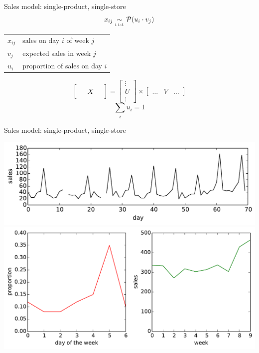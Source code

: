 \documentclass{beamer}
\begin{document}
\begin{frame}{Sales model: single-product, single-store}
 \begin{equation}
  x_{ij} \underset{\text{\tiny i.i.d.}}{\sim} \mathcal{P}(u_i \cdot v_j)
 \end{equation}
 \begin{tabular}{ll}
  $x_{ij}$ & sales on day $i$ of week $j$ \\
  $v_j$    & expected sales in week $j$ \\
  $u_i$    & proportion of sales on day $i$
 \end{tabular}
 \begin{equation}
  \begin{bmatrix} \; & & \; \\ & X & \\ & & \end{bmatrix} = \begin{bmatrix} \vdots \\ U \\ \vdots \end{bmatrix} \times \begin{bmatrix} \hdots & V & \hdots \end{bmatrix}
 \end{equation}
 \begin{equation}
  \sum_i u_i = 1
 \end{equation}
\end{frame}

\begin{frame}{Sales model: single-product, single-store}
 \begin{center}
  \includegraphics[width=0.8\columnwidth]{fast_seller_small.pdf} \\
  \includegraphics[width=0.8\columnwidth]{fast_factorisation.pdf}
 \end{center}
\end{frame}
\end{document}
